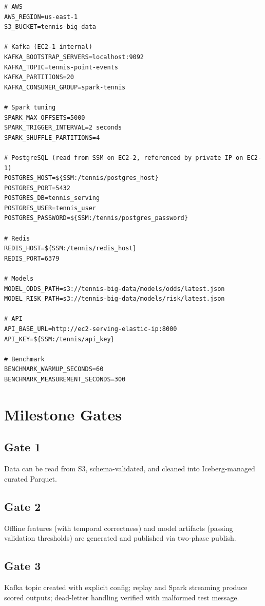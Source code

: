 \documentclass[11pt,a4paper]{article}
\begin{document}
\begin{lstlisting}[caption={.env.example}]
# AWS
AWS_REGION=us-east-1
S3_BUCKET=tennis-big-data

# Kafka (EC2-1 internal)
KAFKA_BOOTSTRAP_SERVERS=localhost:9092
KAFKA_TOPIC=tennis-point-events
KAFKA_PARTITIONS=20
KAFKA_CONSUMER_GROUP=spark-tennis

# Spark tuning
SPARK_MAX_OFFSETS=5000
SPARK_TRIGGER_INTERVAL=2 seconds
SPARK_SHUFFLE_PARTITIONS=4

# PostgreSQL (read from SSM on EC2-2, referenced by private IP on EC2-1)
POSTGRES_HOST=${SSM:/tennis/postgres_host}
POSTGRES_PORT=5432
POSTGRES_DB=tennis_serving
POSTGRES_USER=tennis_user
POSTGRES_PASSWORD=${SSM:/tennis/postgres_password}

# Redis
REDIS_HOST=${SSM:/tennis/redis_host}
REDIS_PORT=6379

# Models
MODEL_ODDS_PATH=s3://tennis-big-data/models/odds/latest.json
MODEL_RISK_PATH=s3://tennis-big-data/models/risk/latest.json

# API
API_BASE_URL=http://ec2-serving-elastic-ip:8000
API_KEY=${SSM:/tennis/api_key}

# Benchmark
BENCHMARK_WARMUP_SECONDS=60
BENCHMARK_MEASUREMENT_SECONDS=300
\end{lstlisting}

\section{Milestone Gates}

\subsection{Gate 1}
Data can be read from S3, schema-validated, and cleaned into Iceberg-managed curated Parquet.

\subsection{Gate 2}
Offline features (with temporal correctness) and model artifacts (passing validation thresholds)
are generated and published via two-phase publish.

\subsection{Gate 3}
Kafka topic created with explicit config; replay and Spark streaming produce scored outputs;
dead-letter handling verified with malformed test message.
\end{document}
